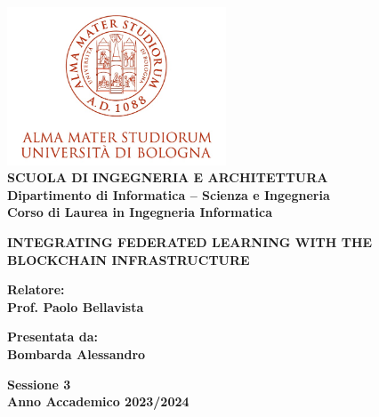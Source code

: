 \begin{titlepage}
\begin{center}
\includegraphics[width=2.56in]{figures/logo/logo_unibo.png}\\

\vspace{5mm}
{\small{\bf SCUOLA DI INGEGNERIA E ARCHITETTURA\\
\vspace{2mm}
Dipartimento di Informatica -- Scienza e Ingegneria\\
\vspace{2mm}
Corso di Laurea in Ingegneria Informatica }}
\end{center}
\vspace{11.9mm}
\begin{center}
{\LARGE{\bf \uppercase{Integrating Federated Learning with the Blockchain Infrastructure}}}
\end{center}
\vspace{11.9mm}
\par
\noindent
\begin{minipage}[t]{0.47\textwidth}
{\normalsize{\bf Relatore:\\
Prof. Paolo Bellavista

\vspace{5mm}
}}
\end{minipage}
\hfill
\begin{minipage}[t]{0.47\textwidth}\raggedleft
{\normalsize{\bf Presentata da:\\
Bombarda Alessandro}}
\end{minipage}
\vspace{10mm} %
\begin{center}
{\normalsize{\bf Sessione 3 \\ %
Anno Accademico 2023/2024}} %
\end{center}
\end{titlepage}

